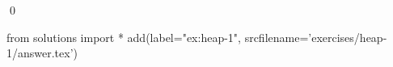 
\begin{ex} 
  \label{ex:heap-1}
  
  \qed
\end{ex} 
\begin{python0}
from solutions import *
add(label="ex:heap-1",
    srcfilename='exercises/heap-1/answer.tex') 
\end{python0}
